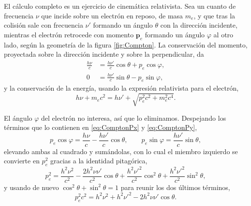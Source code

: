             El cálculo completo es un ejercicio de cinemática relativista. Sea un cuanto de frecuencia $\nu$ que incide sobre un electrón en reposo, de masa $m_{e}$, y que tras la colisión sale con frecuencia $\nu'$ formando un ángulo $\theta$ con la dirección incidente, mientras el electrón retrocede con momento $\mathbf{p}_{e}$ formando un ángulo $\varphi$ al otro lado, según la geometría de la figura \ref{fig:Compton}. La conservación del momento, proyectada sobre la dirección incidente y sobre la perpendicular, da
            \begin{align}
                \frac{h\nu}{c} &= \frac{h\nu'}{c}\cos\theta + p_{e}\cos\varphi, \label{eq:ComptonPx}\\
                0 &= \frac{h\nu'}{c}\sin\theta - p_{e}\sin\varphi, \label{eq:ComptonPy}
            \end{align}
            y la conservación de la energía, usando la expresión relativista para el electrón,
            \begin{equation}\label{eq:ComptonE}
                h\nu + m_{e}c^{2} = h\nu' + \sqrt{p_{e}^{2}c^{2}+m_{e}^{2}c^{4}} .
            \end{equation}

            El ángulo $\varphi$ del electrón no interesa, así que lo eliminamos. Despejando los términos que lo contienen en \eqref{eq:ComptonPx} y \eqref{eq:ComptonPy},
            \begin{equation}\label{eq:ComptonDespeje}
                p_{e}\cos\varphi = \frac{h\nu}{c} - \frac{h\nu'}{c}\cos\theta,
                \qquad
                p_{e}\sin\varphi = \frac{h\nu'}{c}\sin\theta,
            \end{equation}
            elevando ambas al cuadrado y sumándolas, con lo cual el miembro izquierdo se convierte en $p_{e}^{2}$ gracias a la identidad pitagórica,
            \begin{equation}\label{eq:ComptonSuma}
                p_{e}^{2} = \frac{h^{2}\nu^{2}}{c^{2}} - \frac{2h^{2}\nu\nu'}{c^{2}}\cos\theta + \frac{h^{2}\nu'^{2}}{c^{2}}\cos^{2}\theta + \frac{h^{2}\nu'^{2}}{c^{2}}\sin^{2}\theta,
            \end{equation}
            y usando de nuevo $\cos^{2}\theta+\sin^{2}\theta = 1$ para reunir los dos últimos términos,
            \begin{equation}\label{eq:ComptonPe2}
                p_{e}^{2}c^{2} = h^{2}\nu^{2} + h^{2}\nu'^{2} - 2h^{2}\nu\nu'\cos\theta .
            \end{equation}


